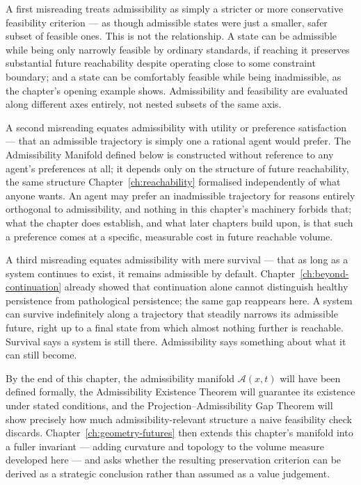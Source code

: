 \documentclass[12pt,twoside,openright]{book}
\newcommand{\adm}{\mathcal{A}}
\begin{document}
A first misreading treats admissibility as simply a stricter
or more conservative feasibility criterion --- as though
admissible states were just a smaller, safer subset of
feasible ones. This is not the relationship. A state can be
admissible while being only narrowly feasible by ordinary
standards, if reaching it preserves substantial future
reachability despite operating close to some constraint
boundary; and a state can be comfortably feasible while being
inadmissible, as the chapter's opening example shows.
Admissibility and feasibility are evaluated along different
axes entirely, not nested subsets of the same axis.

A second misreading equates admissibility with utility or
preference satisfaction --- that an admissible trajectory is
simply one a rational agent would prefer. The Admissibility
Manifold defined below is constructed without reference to
any agent's preferences at all; it depends only on the
structure of future reachability, the same structure
Chapter~\ref{ch:reachability} formalised independently of what
anyone wants. An agent may prefer an inadmissible trajectory
for reasons entirely orthogonal to admissibility, and nothing
in this chapter's machinery forbids that; what the chapter
does establish, and what later chapters build upon, is that
such a preference comes at a specific, measurable cost in
future reachable volume.

A third misreading equates admissibility with mere survival
--- that as long as a system continues to exist, it remains
admissible by default. Chapter~\ref{ch:beyond-continuation}
already showed that continuation alone cannot distinguish
healthy persistence from pathological persistence; the same
gap reappears here. A system can survive indefinitely along a
trajectory that steadily narrows its admissible future, right
up to a final state from which almost nothing further is
reachable. Survival says a system is still there. Admissibility
says something about what it can still become.

By the end of this chapter, the admissibility manifold
$\adm(x,t)$ will have been defined formally, the Admissibility
Existence Theorem will guarantee its existence under stated
conditions, and the Projection--Admissibility Gap Theorem will
show precisely how much admissibility-relevant structure a
naive feasibility check discards. Chapter~\ref{ch:geometry-futures}
then extends this chapter's manifold into a fuller invariant
--- adding curvature and topology to the volume measure
developed here --- and asks whether the resulting
preservation criterion can be derived as a strategic
conclusion rather than assumed as a value judgement.
\end{document}
